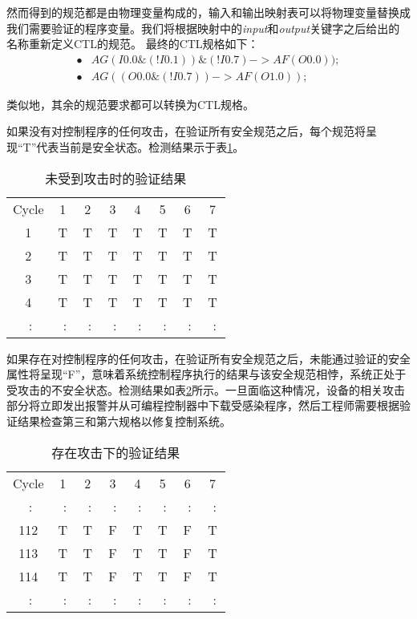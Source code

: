 然而得到的规范都是由物理变量构成的，输入和输出映射表可以将物理变量替换成我们需要验证的程序变量。我们将根据映射中的\textit {input}和\textit {output}关键字之后给出的名称重新定义CTL的规范。 最终的CTL规格如下：
\[\begin{split}
\bullet &AG(I0.0\&(! I0.1) )\&(! I0.7) -> AF(O0.0));\\\bullet &AG((O0.0 \& (! I0.7)) -> AF(O1.0));
\end{split}
\]

类似地，其余的规范要求都可以转换为CTL规格。

如果没有对控制程序的任何攻击，在验证所有安全规范之后，每个规范将呈现“T”代表当前是安全状态。检测结果示于表\ref{spec:table3}。

\begin{table}[!htb]
\centering
\caption{未受到攻击时的验证结果}
\label{spec:table3}
\begin{tabular}{cccccccc}

\hline
Cycle & 1 & 2 & 3 & 4 & 5 & 6 & 7\\

1 & T & T & T & T & T & T & T\\

2 & T & T & T & T & T & T & T\\

3 & T & T & T & T & T & T & T\\

4 & T & T & T & T & T & T & T\\

~$\colon$ & ~$\colon$ & ~$\colon$ & ~$\colon$ & ~$\colon$ & ~$\colon$ & ~$\colon$ & ~$\colon$\\
\hline
\end{tabular}
\end{table} 

如果存在对控制程序的任何攻击，在验证所有安全规范之后，未能通过验证的安全属性将呈现“F”，意味着系统控制程序执行的结果与该安全规范相悖，系统正处于受攻击的不安全状态。检测结果如表\ref{spec:table4}所示。一旦面临这种情况，设备的相关攻击部分将立即发出报警并从可编程控制器中下载受感染程序，然后工程师需要根据验证结果检查第三和第六规格以修复控制系统。

\begin{table}[!htb]
\centering
\caption{存在攻击下的验证结果}
\label{spec:table4}
\begin{tabular}{cccccccc}

\hline
Cycle & 1 & 2 & 3 & 4 & 5 & 6 & 7\\

~$\colon$ & ~$\colon$ & ~$\colon$ & ~$\colon$ & ~$\colon$ & ~$\colon$ & ~$\colon$ & ~$\colon$\\

112 & T & T & F & T & T & F & T\\

113 & T & T & F & T & T & F & T\\

114 & T & T & F & T & T & F & T\\

~$\colon$ & ~$\colon$ & ~$\colon$ & ~$\colon$ & ~$\colon$ & ~$\colon$ & ~$\colon$ & ~$\colon$\\
\hline
\end{tabular}
\end{table} 

